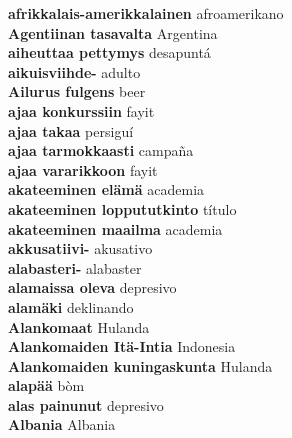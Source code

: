 \textbf{ afrikkalais-amerikkalainen  } afroamerikano \\
\textbf{ Agentiinan tasavalta  } Argentina \\
\textbf{ aiheuttaa pettymys  } desapuntá \\
\textbf{ aikuisviihde-  } adulto \\
\textbf{ Ailurus fulgens  } beer \\
\textbf{ ajaa konkurssiin  } fayit \\
\textbf{ ajaa takaa  } persiguí \\
\textbf{ ajaa tarmokkaasti  } campaña \\
\textbf{ ajaa vararikkoon  } fayit \\
\textbf{ akateeminen elämä  } academia \\
\textbf{ akateeminen loppututkinto  } título \\
\textbf{ akateeminen maailma  } academia \\
\textbf{ akkusatiivi-  } akusativo \\
\textbf{ alabasteri-  } alabaster \\
\textbf{ alamaissa oleva  } depresivo \\
\textbf{ alamäki  } deklinando \\
\textbf{ Alankomaat  } Hulanda \\
\textbf{ Alankomaiden Itä-Intia  } Indonesia \\
\textbf{ Alankomaiden kuningaskunta  } Hulanda \\
\textbf{ alapää  } bòm \\
\textbf{ alas painunut  } depresivo \\
\textbf{ Albania  } Albania \\
